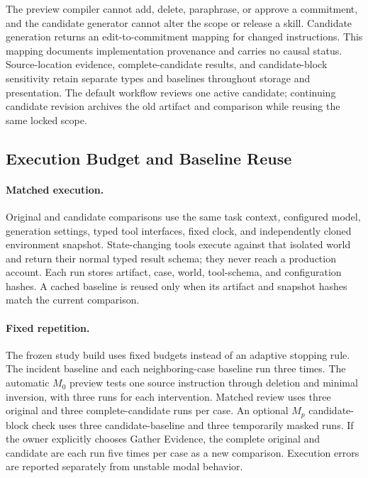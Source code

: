 The preview compiler cannot add, delete, paraphrase, or approve a commitment, and the candidate generator cannot alter the scope or release a skill. Candidate generation returns an edit-to-commitment mapping for changed instructions. This mapping documents implementation provenance and carries no causal status. Source-location evidence, complete-candidate results, and candidate-block sensitivity retain separate types and baselines throughout storage and presentation. The default workflow reviews one active candidate; continuing candidate revision archives the old artifact and comparison while reusing the same locked scope.

\subsection{Execution Budget and Baseline Reuse}
\label{app:execution-protocol}

\paragraph{Matched execution.}
Original and candidate comparisons use the same task context, configured model, generation settings, typed tool interfaces, fixed clock, and independently cloned environment snapshot. State-changing tools execute against that isolated world and return their normal typed result schema; they never reach a production account. Each run stores artifact, case, world, tool-schema, and configuration hashes. A cached baseline is reused only when its artifact and snapshot hashes match the current comparison.

\paragraph{Fixed repetition.}
The frozen study build uses fixed budgets instead of an adaptive stopping rule. The incident baseline and each neighboring-case baseline run three times. The automatic $M_0$ preview tests one source instruction through deletion and minimal inversion, with three runs for each intervention. Matched review uses three original and three complete-candidate runs per case. An optional $M_p$ candidate-block check uses three candidate-baseline and three temporarily masked runs. If the owner explicitly chooses Gather Evidence, the complete original and candidate are each run five times per case as a new comparison. Execution errors are reported separately from unstable modal behavior.

